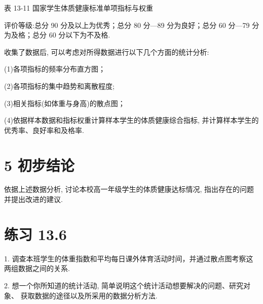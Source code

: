 \documentclass[10pt]{article}
\begin{document}
表 13-11 国家学生体质健康标准单项指标与权重

\begin{center}
\end{center}

评价等级:总分 90 分及以上为优秀；总分 80 分—89 分为良好；总分 60 分—79 分为及格；总分 60 分以下为不及格.

收集了数据后, 可以考虑对所得数据进行以下几个方面的统计分析:

(1)各项指标的频率分布直方图；

(2)各项指标的集中趋势和离散程度;

(3)相关指标(如体重与身高)的散点图；

(4)依据样本数据和指标权重计算样本学生的体质健康综合指标, 并计算样本学生的优秀率、良好率和及格率.

\section*{5 初步结论}

依据上述数据分析, 讨论本校高一年级学生的体质健康达标情况, 指出存在的问题并提出改进的建议.





\section*{练习 13.6}

1. 调查本班学生的体重指数和平均每日课外体育活动时间，并通过散点图考察这两组数据之间的关系.

2. 想一个你所知道的统计活动, 简单说明这个统计活动想要解决的问题、研究对象、 获取数据的途径以及所采用的数据分析方法.
\end{document}
